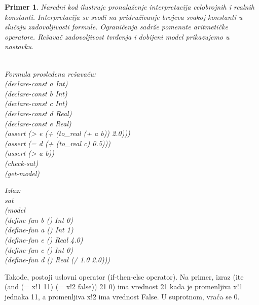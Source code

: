 \documentclass[12pt,oneside]{memoir}
\newtheorem{primer}{Primer}
\begin{document}
\begin{primer} Naredni kod ilustruje pronalaženje interpretacija celobrojnih i realnih konstanti. Interpretacija se svodi na pridruživanje brojeva svakoj konstanti u slučaju zadovoljivosti formule. Ograničenja sadrže pomenute aritmetičke operatore. Rešavač zadovoljivost tvrđenja i dobijeni model prikazujemo u nastavku.\\ \\
\begin{minipage}[b]{0.4\textwidth}
Formula prosleđena rešavaču:
\\(declare-const a Int)
\\(declare-const b Int)
\\(declare-const c Int)
\\(declare-const d Real)
\\(declare-const e Real)
\\(assert (> e (+ (to\_real (+ a b)) 2.0)))
\\(assert (= d (+ (to\_real c) 0.5)))
\\(assert (> a b))
\\(check-sat)
\\(get-model)
\end{minipage}
\hspace{3.15cm}
\begin{minipage}[t]{0.4\textwidth}
\vspace{-7.2cm}
Izlaz:
\\sat 
\\(model
\\(define-fun b () Int 0) 
\\(define-fun a () Int 1) 
\\(define-fun e () Real 4.0) \\(define-fun c () Int 0) \\(define-fun d () Real (/ 1.0 2.0)))
\end{minipage}


\end{primer}


Takođe, postoji uslovni operator (if-then-else operator). Na primer,
izraz (ite (and (= x!1 11) (= x!2 false)) 21 0) ima vrednost 21 kada je promenljiva x!1 jednaka 11, a promenljiva x!2 ima vrednost False. U suprotnom, vraća se 0.
\end{document}
